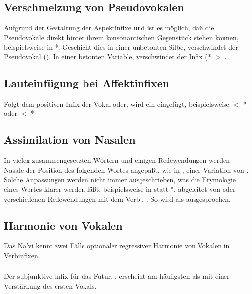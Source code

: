 \subsection{Verschmelzung von Pseudovokalen} Aufgrund der Gestaltung der
Aspektinfixe  und  ist es m\"oglich, da\ss{} die
Pseudovokale direkt hinter ihrem konsonantischen Gegenst\"uck stehen k\"onnen,
beispielsweise in *. Geschieht dies in einer
unbetonten Silbe, verschwindet der Pseudovokal (). In einer
betonten Variable, verschwindet der Infix (* $>$
.

\subsection{Lauteinf\"ugung bei Affektinfixen} Folgt dem positiven Infix
 der Vokal  oder, wird ein  eingef\"ugt, beispielsweise
 $<$ * oder  $<$ *\label{l-and-s:eiy-epenth}

\subsection{Assimilation von Nasalen} In vielen zusammengesetzten W\"ortern und
einigen Redewendungen werden Nasale der Position des folgenden Wortes angepa\ss{}t,
wie in , einer Variation von . Solche Anpassungen werden nicht
immer ausgeschrieben, was die Etymologie eines Wortes klarer werden l\"a\ss{}t,
beispielsweise in  statt *, abgeleitet von  oder
verschiedenen Redewendungen mit dem Verb , . So wird 
als  ausgesprochen.\label{l-and-s:nasalassim}

\subsection{Harmonie von Vokalen} Das Na’vi kennt zwei F\"alle optionaler
regressiver Harmonie von Vokalen in Verbinfixen.

\subsubsection{} Der subjunktive Infix f\"ur das Futur, , erscheint
am h\"aufigsten als  mit einer Verst\"arkung des ersten Vokals.

